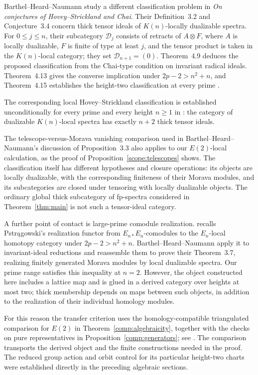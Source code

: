 \begin{remark}
\label{scope:tensor-ideals}
Barthel--Heard--Naumann study a different classification problem in
\emph{On conjectures of Hovey--Strickland and Chai}.  Their
Definition~3.2 and Conjecture~3.4 concern thick tensor ideals of
\(K(n)\)-locally dualizable spectra.  For \(0\leq j\leq n\),
their subcategory \(\mathcal D_j\) consists of retracts of
\(A\otimes F\), where \(A\) is locally dualizable, \(F\) is
finite of type at least \(j\), and the tensor product is taken in
the \(K(n)\)-local category; they set
\(\mathcal D_{n+1}=(0)\).  Theorem~4.9 deduces the proposed
classification from the Chai-type condition on invariant radical
ideals.  Theorem~4.13 gives the converse implication under
\(2p-2>n^2+n\), and Theorem~4.15 establishes the height-two
classification at every prime \cite{BHN2022}.

The corresponding local Hovey--Strickland classification is established
unconditionally for every prime and every height \(n\geq1\) in
\cite[Theorem~1.2]{OpenAIStabilizerIdeals2026}: the category of dualizable
\(K(n)\)-local spectra has exactly \(n+2\) thick tensor ideals.

The telescope-versus-Morava vanishing comparison used in Barthel--Heard--Naumann's
discussion of Proposition~3.3 also applies to our \(E(2)\)-local
calculation, as the proof of Proposition~\ref{scope:telescopes}
shows.  The classification itself has different hypotheses and
closure operations: its objects are locally dualizable, with the
corresponding finiteness of their Morava modules, and its subcategories
are closed under tensoring with locally dualizable objects.  The
ordinary global thick subcategory of fp-spectra considered in
Theorem~\ref{thm:main} is not such a tensor-ideal category.

A further point of contact is large-prime comodule realization.
\cite[Lemma~3.11]{BHN2022} recalls Pstr{\k a}gowski's realization
functor from \(E_{n*}E_n\)-comodules to the \(E_n\)-local homotopy
category under \(2p-2>n^2+n\).  Barthel--Heard--Naumann apply it to
invariant-ideal reductions and reassemble them to prove their
Theorem~3.7, realizing finitely generated Morava modules by local
dualizable spectra.  Our prime range satisfies this inequality at
\(n=2\).  However, the object constructed here includes a lattice
map and is glued in a derived category over heights at most two;
thick membership depends on maps between such objects, in addition
to the realization of their individual homology modules.

For this reason the transfer criterion uses the homology-compatible
triangulated comparison for \(E(2)\) in Theorem~\ref{comp:algebraicity},
together with the checks on pure representatives in
Proposition~\ref{comp:generators}; see
\cite[Corollary~6.9 in the cited preprint version]{Pstragowski2021}.
The comparison transports the derived object and the finite constructions
needed in the proof.  The reduced group action and orbit control for its
particular height-two charts were established directly in the preceding
algebraic sections.
\end{remark}
